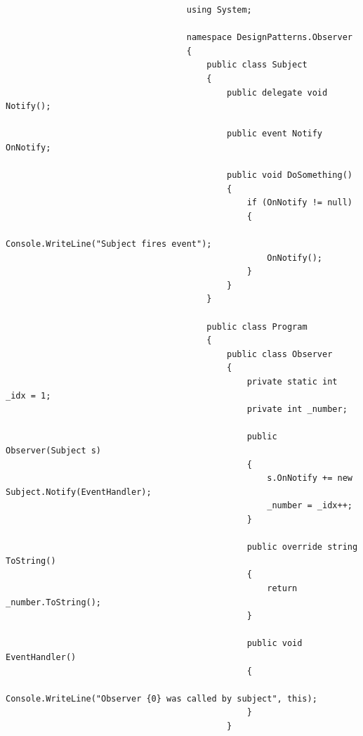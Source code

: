 \documentclass[a4paper,10pt]{article}
\begin{document}
                                \begin{lstlisting}
                                    using System;

                                    namespace DesignPatterns.Observer
                                    {
                                        public class Subject
                                        {
                                            public delegate void Notify();
                                    
                                            public event Notify OnNotify;
                                    
                                            public void DoSomething()
                                            {
                                                if (OnNotify != null)
                                                {
                                                    Console.WriteLine("Subject fires event");
                                                    OnNotify();
                                                }
                                            }
                                        }
                                    
                                        public class Program
                                        {
                                            public class Observer
                                            {
                                                private static int _idx = 1;
                                                private int _number;
                                    
                                                public Observer(Subject s)
                                                {
                                                    s.OnNotify += new Subject.Notify(EventHandler);
                                                    _number = _idx++;
                                                }
                                    
                                                public override string ToString()
                                                {
                                                    return _number.ToString();
                                                }
                                    
                                                public void EventHandler()
                                                {
                                                    Console.WriteLine("Observer {0} was called by subject", this);
                                                }
                                            }
                                    

\end{lstlisting}
\end{document}
